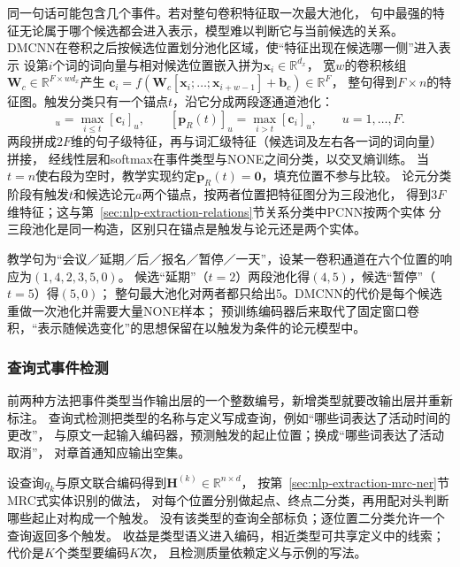 同一句话可能包含几个事件。若对整句卷积特征取一次最大池化，
句中最强的特征无论属于哪个候选都会进入表示，模型难以判断它与当前候选的关系。
DMCNN在卷积之后按候选位置划分池化区域，使“特征出现在候选哪一侧”进入表示
设第$i$个词的词向量与相对候选位置嵌入拼为$\bm{x}_i\in\mathbb{R}^{d_x}$，
宽$w$的卷积核组$\bm{W}_c\in\mathbb{R}^{F\times wd_x}$产生
$\bm{c}_i=f(\bm{W}_c[\bm{x}_{i};\ldots;\bm{x}_{i+w-1}]+\bm{b}_c)\in\mathbb{R}^{F}$，
整句得到$F\times n$的特征图。触发分类只有一个锚点$t$，沿它分成两段逐通道池化：
\begin{equation}
  [\bm{p}_{L}(t)]_u=\max_{i\leq t}[\bm{c}_i]_u,\qquad
  [\bm{p}_{R}(t)]_u=\max_{i>t}[\bm{c}_i]_u,\qquad u=1,\ldots,F.
  \label{eq:nlp-extraction-dmcnn}
\end{equation}
两段拼成$2F$维的句子级特征，再与词汇级特征（候选词及左右各一词的词向量）拼接，
经线性层和softmax在事件类型与NONE之间分类，以交叉熵训练。
当$t=n$使右段为空时，教学实现约定$\bm{p}_R(t)=\bm{0}$，填充位置不参与比较。
论元分类阶段有触发$t$和候选论元$a$两个锚点，按两者位置把特征图分为三段池化，
得到$3F$维特征；这与第~\ref{sec:nlp-extraction-relations}节关系分类中PCNN按两个实体
分三段池化是同一构造，区别只在锚点是触发与论元还是两个实体。

教学句为“会议／延期／后／报名／暂停／一天”，设某一卷积通道在六个位置的响应为$(1,4,2,3,5,0)$。
候选“延期”（$t=2$）两段池化得$(4,5)$，候选“暂停”（$t=5$）得$(5,0)$；
整句最大池化对两者都只给出5。DMCNN的代价是每个候选重做一次池化并需要大量NONE样本；
预训练编码器后来取代了固定窗口卷积，“表示随候选变化”的思想保留在以触发为条件的论元模型中。

\subsubsection{查询式事件检测}
\label{sec:nlp-extraction-event-query}

前两种方法把事件类型当作输出层的一个整数编号，新增类型就要改输出层并重新标注。
查询式检测把类型的名称与定义写成查询，例如“哪些词表达了活动时间的更改”，
与原文一起输入编码器，预测触发的起止位置；换成“哪些词表达了活动取消”，
对章首通知应输出空集。

设查询$q_k$与原文联合编码得到$\bm{H}^{(k)}\in\mathbb{R}^{n\times d}$，
按第~\ref{sec:nlp-extraction-mrc-ner}节MRC式实体识别的做法，
对每个位置分别做起点、终点二分类，再用配对头判断哪些起止对构成一个触发。
没有该类型的查询全部标负；逐位置二分类允许一个查询返回多个触发。
收益是类型语义进入编码，相近类型可共享定义中的线索；代价是$K$个类型要编码$K$次，
且检测质量依赖定义与示例的写法。

